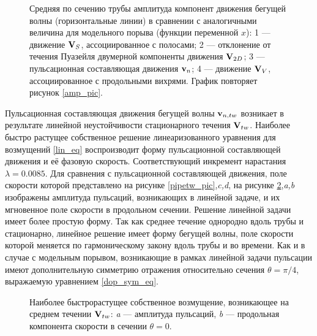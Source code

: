 \begin{figure}
\caption{Средняя по сечению трубы амплитуда компонент движения бегущей волны (горизонтальные линии) в сравнении с аналогичными величина для модельного порыва (функции переменной $x$): 1 --- движение $\mathbf{V}_S$, ассоциированное с полосами; 2 --- отклонение от течения Пуазейля двумерной компоненты движения $\mathbf{V}_{2D}$; 3 --- пульсационная составляющая движения $\mathbf{v}_n$; 4 --- движение $\mathbf{V}_V$, ассоциированное с продольными вихрями. График повторяет рисунок \ref{amp_pic}.}
\label{pipetw_amp_pic}
\end{figure}

Пульсационная составляющая движения бегущей волны $\mathbf{v}_{n,tw}$ возникает в результате линейной неустойчивости стационарного течения $\mathbf{V}_{tw}$. Наиболее быстро растущее собственное решение линеаризованного уравнения для возмущений \eqref{lin_eq} воспроизводит форму пульсационной составляющей движения и её фазовую скорость. Соответствующий инкремент нарастания $\lambda = 0.0085$. Для сравнения с пульсационной составляющей движения, поле скорости которой представлено на рисунке \ref{pipetw_pic},{\it c,d}, на рисунке \ref{pipetw_lin_pic},{\it a,b} изображены амплитуда пульсаций, возникающих в линейной задаче, и их мгновенное поле скорости в продольном сечении. Решение линейной задачи имеет более простую форму. Так как среднее течение однородно вдоль трубы и стационарно, линейное решение имеет форму бегущей волны, поле скорости которой меняется по гармоническому закону вдоль трубы и во времени. Как и в случае с модельным порывом, возникающие в рамках линейной задачи пульсации имеют дополнительную симметрию отражения относительно сечения $\theta = \pi/4$, выражаемую уравнением \eqref{dop_sym_eq}. 


\begin{figure}
\caption{Наиболее быстрорастущее собственное возмущение, возникающее на среднем течении $\mathbf{V}_{tw}$: {\it a} --- амплитуда пульсаций, {\it b} --- продольная компонента скорости в сечении $\theta = 0$. }
\label{pipetw_lin_pic}
\end{figure}



